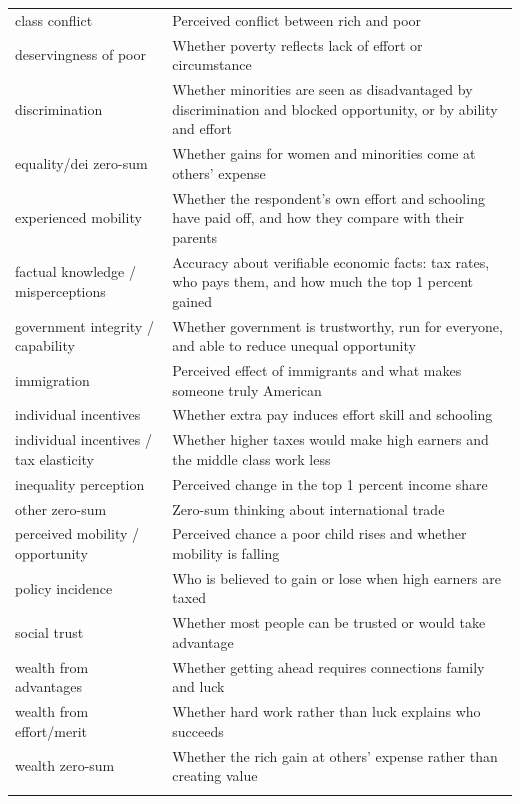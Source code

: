\documentclass[11pt, headsepline]{article}
\begin{document}
\begin{longtable}{@{}p{2.2in} p{3.7in}@{}}
\quad class conflict & Perceived conflict between rich and poor \\
\quad deservingness of poor & Whether poverty reflects lack of effort or circumstance \\
\quad discrimination & Whether minorities are seen as disadvantaged by discrimination and blocked opportunity, or by ability and effort \\
\quad equality/dei zero-sum & Whether gains for women and minorities come at others' expense \\
\quad experienced mobility & Whether the respondent's own effort and schooling have paid off, and how they compare with their parents \\
\quad factual knowledge / misperceptions & Accuracy about verifiable economic facts: tax rates, who pays them, and how much the top 1 percent gained \\
\quad government integrity / capability & Whether government is trustworthy, run for everyone, and able to reduce unequal opportunity \\
\quad immigration & Perceived effect of immigrants and what makes someone truly American \\
\quad individual incentives & Whether extra pay induces effort skill and schooling \\
\quad individual incentives / tax elasticity & Whether higher taxes would make high earners and the middle class work less \\
\quad inequality perception & Perceived change in the top 1 percent income share \\
\quad other zero-sum & Zero-sum thinking about international trade \\
\quad perceived mobility / opportunity & Perceived chance a poor child rises and whether mobility is falling \\
\quad policy incidence & Who is believed to gain or lose when high earners are taxed \\
\quad social trust & Whether most people can be trusted or would take advantage \\
\quad wealth from advantages & Whether getting ahead requires connections family and luck \\
\quad wealth from effort/merit & Whether hard work rather than luck explains who succeeds \\
\quad wealth zero-sum & Whether the rich gain at others' expense rather than creating value \\
\addlinespace[4pt]
\multicolumn{2}{@{}l}{\bfseries worldview/values}\\[2pt]

\end{longtable}
\end{document}
